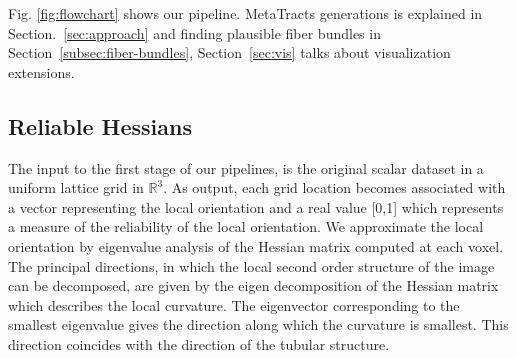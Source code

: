 Fig. \ref{fig:flowchart} shows our pipeline. MetaTracts generations  is explained in Section.~\ref{sec:approach} and  finding plausible fiber bundles in Section~\ref{subsec:fiber-bundles}, Section~\ref{sec:vis} talks about visualization extensions.


\subsection {Reliable Hessians}
\label{subsec:rh}

The input to the first stage of our pipelines, is the original scalar dataset in a uniform lattice grid in $\mathbb{R}^3$. As output, each grid location becomes associated with a vector representing the local orientation and a real value [0,1] which represents a measure of the reliability of the local orientation. We approximate the local orientation by eigenvalue analysis of the Hessian matrix computed at each voxel. The principal directions, in which the local second order structure of the image can be decomposed, are given by the eigen decomposition of the Hessian matrix which describes the local curvature.
The eigenvector corresponding to the smallest eigenvalue gives the direction along which the curvature is smallest. This direction coincides with the direction of the tubular structure.

